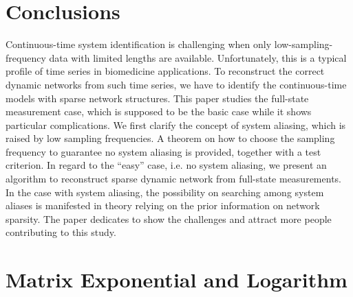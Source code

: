 \documentclass[letterpaper,10pt,journal,final]{IEEEtran}
\theoremstyle{definition}
\theoremstyle{remark}
\begin{document}
\section{Conclusions}
\label{sec:conclusions}

Continuous-time system identification is challenging when only
low-sampling-frequency data with limited lengths are available. Unfortunately,
this is a typical profile of time series in biomedicine applications. To
reconstruct the correct dynamic networks from such time series, we have to
identify the continuous-time models with sparse network structures.  This paper
studies the full-state measurement case, which is supposed to be the basic case
while it shows particular complications. We first clarify the concept of system
aliasing, which is raised by low sampling frequencies. A theorem on how to
choose the sampling frequency to guarantee no system aliasing is provided,
together with a test criterion. In regard to the ``easy'' case, i.e. no system
aliasing, we present an algorithm to reconstruct sparse dynamic network from
full-state measurements. In the case with system aliasing, the possibility on
searching among system aliases is manifested in theory relying on the prior
information on network sparsity. The paper dedicates to show the challenges and
attract more people contributing to this study.








\appendices

\section{Matrix Exponential and Logarithm}
\end{document}

